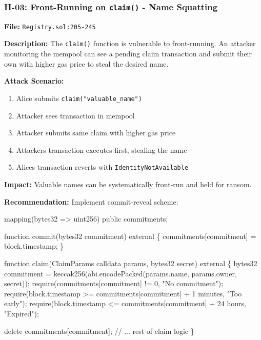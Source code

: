 \documentclass[
]{article}
\newenvironment{Shaded}{}{}
\newcommand{\NormalTok}[1]{#1}
\providecommand{\tightlist}{%
  \setlength{\itemsep}{0pt}\setlength{\parskip}{0pt}}
\begin{document}
\subsubsection{\texorpdfstring{H-03: Front-Running on \texttt{claim()} -
Name
Squatting}{H-03: Front-Running on claim() - Name Squatting}}\label{h-03-front-running-on-claim---name-squatting}

\textbf{File:} \texttt{Registry.sol:205-245}

\textbf{Description:} The \texttt{claim()} function is vulnerable to
front-running. An attacker monitoring the mempool can see a pending
claim transaction and submit their own with higher gas price to steal
the desired name.

\textbf{Attack Scenario:}

\begin{enumerate}
\def\labelenumi{\arabic{enumi}.}
\tightlist
\item
  Alice submits \texttt{claim("valuable\_name")}
\item
  Attacker sees transaction in mempool
\item
  Attacker submits same claim with higher gas price
\item
  Attacker\textquotesingle s transaction executes first, stealing the
  name
\item
  Alice\textquotesingle s transaction reverts with
  \texttt{IdentityNotAvailable}
\end{enumerate}

\textbf{Impact:} Valuable names can be systematically front-run and held
for ransom.

\textbf{Recommendation:} Implement commit-reveal scheme:

\begin{Shaded}
\begin{Highlighting}[]
\NormalTok{mapping(bytes32 =\textgreater{} uint256) public commitments;}

\NormalTok{function commit(bytes32 commitment) external \{}
\NormalTok{    commitments[commitment] = block.timestamp;}
\NormalTok{\}}

\NormalTok{function claim(ClaimParams calldata params, bytes32 secret) external \{}
\NormalTok{    bytes32 commitment = keccak256(abi.encodePacked(params.name, params.owner, secret));}
\NormalTok{    require(commitments[commitment] != 0, "No commitment");}
\NormalTok{    require(block.timestamp \textgreater{}= commitments[commitment] + 1 minutes, "Too early");}
\NormalTok{    require(block.timestamp \textless{}= commitments[commitment] + 24 hours, "Expired");}

\NormalTok{    delete commitments[commitment];}
\NormalTok{    // ... rest of claim logic}
\NormalTok{\}}
\end{Highlighting}
\end{Shaded}
\end{document}
